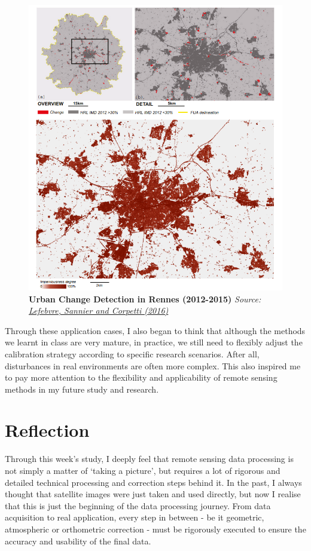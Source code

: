 \documentclass[
  letterpaper,
  DIV=11,
  numbers=noendperiod]{scrreprt}
\begin{document}
\begin{figure}[H]

{\centering \includegraphics[width=0.8\linewidth,height=\textheight,keepaspectratio]{images/urban_change_rennes.png}

}

\caption{\textbf{Urban Change Detection in Rennes
(2012-2015)}\emph{\hfill\break
Source: \href{https://doi.org/10.3390/rs8070606}{Lefebvre, Sannier and
Corpetti (2016)}}}

\end{figure}%

Through these application cases, I also began to think that although the
methods we learnt in class are very mature, in practice, we still need
to flexibly adjust the calibration strategy according to specific
research scenarios. After all, disturbances in real environments are
often more complex. This also inspired me to pay more attention to the
flexibility and applicability of remote sensing methods in my future
study and research.

\section{Reflection}\label{reflection-1}

Through this week's study, I deeply feel that remote sensing data
processing is not simply a matter of `taking a picture', but requires a
lot of rigorous and detailed technical processing and correction steps
behind it. In the past, I always thought that satellite images were just
taken and used directly, but now I realise that this is just the
beginning of the data processing journey. From data acquisition to real
application, every step in between - be it geometric, atmospheric or
orthometric correction - must be rigorously executed to ensure the
accuracy and usability of the final data.
\end{document}
